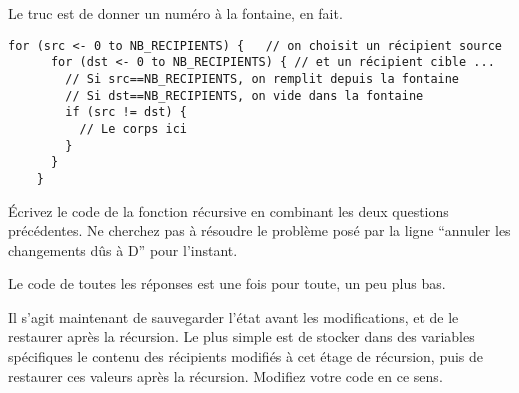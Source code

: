 \documentclass[10pt]{article}\usepackage[correction,nu]{esial}%
\begin{document}
\begin{Reponse}
  Le truc est de donner un numéro à la fontaine, en fait. 
  \begin{Verbatim}[gobble=4]
    for (src <- 0 to NB_RECIPIENTS) {   // on choisit un récipient source 
      for (dst <- 0 to NB_RECIPIENTS) { // et un récipient cible ... 
        // Si src==NB_RECIPIENTS, on remplit depuis la fontaine
        // Si dst==NB_RECIPIENTS, on vide dans la fontaine
        if (src != dst) {
          // Le corps ici
        }
      }
    }
  \end{Verbatim}
\end{Reponse}

\Question Écrivez le code de la fonction récursive en combinant les deux
questions précédentes. Ne cherchez pas à résoudre le problème posé par la ligne
``annuler les changements dûs à D'' pour l'instant.

\begin{Reponse}
  Le code de toutes les réponses est une fois pour toute, un peu plus bas.
            

\end{Reponse}

\Question %
Il s'agit maintenant de sauvegarder l'état avant les modifications, et de le
restaurer après la récursion.  Le plus simple est de stocker dans des variables
spécifiques le contenu des récipients modifiés à cet étage de récursion, puis de
restaurer ces valeurs après la récursion. Modifiez votre code en ce sens.
\end{document}
